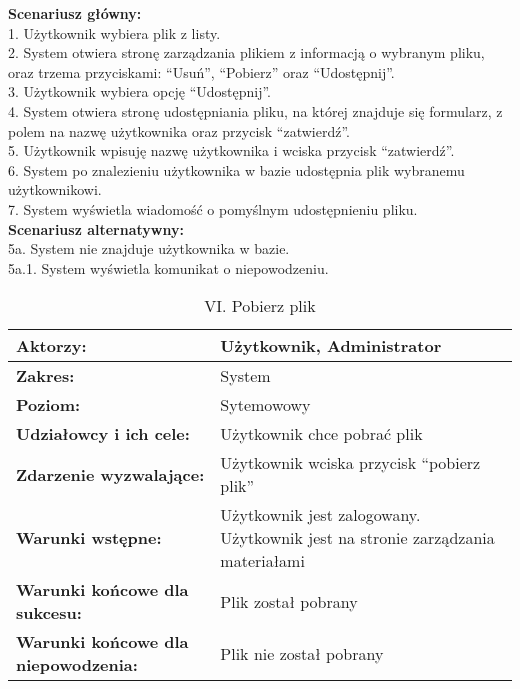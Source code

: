 \textbf{Scenariusz główny:}\\
1. Użytkownik wybiera plik z listy.\\
2. System otwiera stronę zarządzania plikiem z informacją o wybranym pliku, oraz trzema przyciskami: “Usuń”, “Pobierz” oraz “Udostępnij”.\\
3. Użytkownik wybiera opcję “Udostępnij”.\\
4. System otwiera stronę udostępniania pliku, na której znajduje się formularz, z polem na nazwę użytkownika oraz przycisk “zatwierdź”.\\
5. Użytkownik wpisuję nazwę użytkownika i wciska przycisk “zatwierdź”.\\
6. System po znalezieniu użytkownika w bazie udostępnia plik wybranemu użytkownikowi.\\
7. System wyświetla wiadomość o pomyślnym udostępnieniu pliku.\\
\textbf{Scenariusz alternatywny:}\\
5a. System nie znajduje użytkownika w bazie.\\
5a.1. System wyświetla komunikat o niepowodzeniu.\\
\newpage
	\begin{table}[H]
\centering
\caption{VI. Pobierz plik}
\label{Pobierzplik}
\begin{tabular}{|p{7cm}|p{7cm}|}
  \hline 
  \textbf{Aktorzy:} & Użytkownik, Administrator\\
  \hline
  \textbf{Zakres:} & System \\
	\hline
  \textbf{Poziom:} & Sytemowowy \\
	\hline
  \textbf{Udziałowcy i ich cele: } & Użytkownik chce pobrać plik \\
	\hline
  \textbf{Zdarzenie wyzwalające: } & Użytkownik wciska przycisk “pobierz plik” \\
	\hline
  \textbf{Warunki wstępne: } & Użytkownik jest zalogowany. Użytkownik jest na stronie zarządzania materiałami
 \\
	\hline
  \textbf{Warunki końcowe dla sukcesu:} & Plik został pobrany\\
	\hline
  \textbf{Warunki końcowe dla niepowodzenia:} & Plik nie został pobrany \\
  \hline
\end{tabular} 
\end{table}

